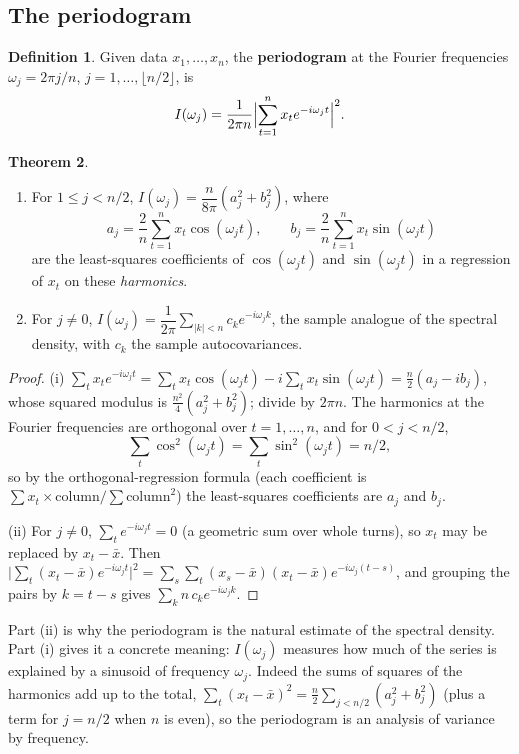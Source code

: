 \documentclass[11pt,a4paper]{article}
\theoremstyle{definition}
\newtheorem{thm}{Theorem}[subsection]
\newtheorem{defn}[thm]{Definition}
\begin{document}
\subsection{The periodogram}

\begin{defn}
Given data $x_1, \dots, x_n$, the \textbf{periodogram} at the Fourier frequencies $\omega_j = 2\pi j/n$, $j = 1, \dots, \lfloor n/2\rfloor$, is
\[
I(\omega_j) = \frac{1}{2\pi n}\Bigl|\sum_{t=1}^nx_te^{-i\omega_jt}\Bigr|^2 .
\]
\end{defn}

\begin{thm}\label{thm:periodogram}
\begin{enumerate}[label=(\roman*)]
\item For $1 \le j < n/2$, $I(\omega_j) = \dfrac{n}{8\pi}(a_j^2 + b_j^2)$, where
\[
a_j = \frac2n\sum_{t=1}^nx_t\cos(\omega_jt) , \qquad b_j = \frac2n\sum_{t=1}^nx_t\sin(\omega_jt)
\]
are the least-squares coefficients of $\cos(\omega_jt)$ and $\sin(\omega_jt)$ in a regression of $x_t$ on these \emph{harmonics}.
\item For $j \ne 0$, $I(\omega_j) = \dfrac1{2\pi}\displaystyle\sum_{|k|<n}c_ke^{-i\omega_jk}$, the sample analogue of the spectral density, with $c_k$ the sample
autocovariances.
\end{enumerate}
\end{thm}

\begin{proof}
(i) $\sum_tx_te^{-i\omega_jt} = \sum_tx_t\cos(\omega_jt) - i\sum_tx_t\sin(\omega_jt) = \frac n2(a_j - ib_j)$, whose squared modulus is $\frac{n^2}4(a_j^2 + b_j^2)$; divide by $2\pi n$. The
harmonics at the Fourier frequencies are orthogonal over $t = 1, \dots, n$, and for $0 < j < n/2$,
\[
\textstyle\sum_t\cos^2(\omega_jt) = \sum_t\sin^2(\omega_jt) = n/2 ,
\]
so by the
orthogonal-regression formula (each coefficient is $\sum x_t\times\text{column}/\sum\text{column}^2$) the least-squares coefficients are $a_j$ and $b_j$.

(ii) For $j \ne 0$, $\sum_te^{-i\omega_jt} = 0$ (a geometric sum over whole turns), so $x_t$ may be replaced by $x_t - \bar x$. Then
$\bigl|\sum_t(x_t - \bar x)e^{-i\omega_jt}\bigr|^2 = \sum_s\sum_t(x_s - \bar x)(x_t - \bar x)e^{-i\omega_j(t-s)}$, and grouping the pairs by $k = t - s$ gives $\sum_kn\,c_ke^{-i\omega_jk}$.
\end{proof}

Part (ii) is why the periodogram is the natural estimate of the spectral density. Part (i) gives it a concrete
meaning: $I(\omega_j)$ measures how much of the series is explained by a sinusoid of frequency $\omega_j$. Indeed the sums of
squares of the harmonics add up to the total, $\sum_t(x_t - \bar x)^2 = \frac n2\sum_{j<n/2}(a_j^2 + b_j^2)$ (plus a term for $j = n/2$ when $n$ is even), so
the periodogram is an analysis of variance by frequency.
\end{document}
